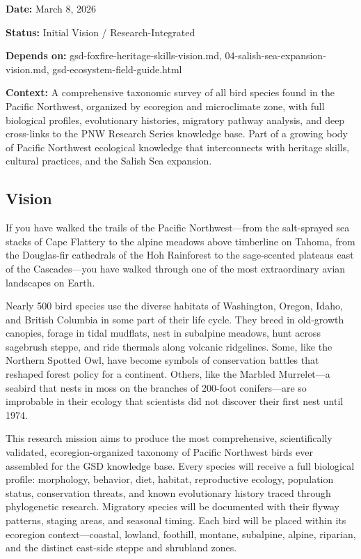 \documentclass[11pt,letterpaper]{article}
\newcommand{\metafield}[2]{\textbf{\sffamily #1} #2\par}
\begin{document}
\metafield{Date:}{March 8, 2026}
\metafield{Status:}{Initial Vision / Research-Integrated}
\metafield{Depends on:}{gsd-foxfire-heritage-skills-vision.md, 04-salish-sea-expansion-vision.md, gsd-ecosystem-field-guide.html}
\metafield{Context:}{A comprehensive taxonomic survey of all bird species found in the Pacific Northwest, organized by ecoregion and microclimate zone, with full biological profiles, evolutionary histories, migratory pathway analysis, and deep cross-links to the PNW Research Series knowledge base. Part of a growing body of Pacific Northwest ecological knowledge that interconnects with heritage skills, cultural practices, and the Salish Sea expansion.}

\subsection{Vision}

If you have walked the trails of the Pacific Northwest---from the salt-sprayed sea stacks of Cape Flattery to the alpine meadows above timberline on Tahoma, from the Douglas-fir cathedrals of the Hoh Rainforest to the sage-scented plateaus east of the Cascades---you have walked through one of the most extraordinary avian landscapes on Earth.

Nearly 500 bird species use the diverse habitats of Washington, Oregon, Idaho, and British Columbia in some part of their life cycle. They breed in old-growth canopies, forage in tidal mudflats, nest in subalpine meadows, hunt across sagebrush steppe, and ride thermals along volcanic ridgelines. Some, like the Northern Spotted Owl, have become symbols of conservation battles that reshaped forest policy for a continent. Others, like the Marbled Murrelet---a seabird that nests in moss on the branches of 200-foot conifers---are so improbable in their ecology that scientists did not discover their first nest until 1974.

This research mission aims to produce the most comprehensive, scientifically validated, ecoregion-organized taxonomy of Pacific Northwest birds ever assembled for the GSD knowledge base. Every species will receive a full biological profile: morphology, behavior, diet, habitat, reproductive ecology, population status, conservation threats, and known evolutionary history traced through phylogenetic research. Migratory species will be documented with their flyway patterns, staging areas, and seasonal timing. Each bird will be placed within its ecoregion context---coastal, lowland, foothill, montane, subalpine, alpine, riparian, and the distinct east-side steppe and shrubland zones.
\end{document}
